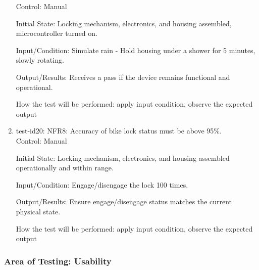 \documentclass[12pt, titlepage]{article}
\begin{document}
\begin{enumerate}
Control: Manual 

Initial State: Locking mechanism, electronics, and housing assembled, microcontroller turned on.

Input/Condition: Simulate rain - Hold housing under a shower for 5 minutes, slowly rotating.

Output/Results: Receives a pass if the device remains functional and operational.

How the test will be performed: apply input condition, observe the expected output

\item{test-id20: NFR8: Accuracy of bike lock status must be above 95\%. \\}
Control: Manual 

Initial State: Locking mechanism, electronics, and housing assembled operationally and within range.

Input/Condition: Engage/disengage the lock 100 times. 

Output/Results: Ensure engage/disengage status matches the current physical state.

How the test will be performed: apply input condition, observe the expected output
\end{enumerate}

\subsubsection{Area of Testing: Usability}
\end{document}
